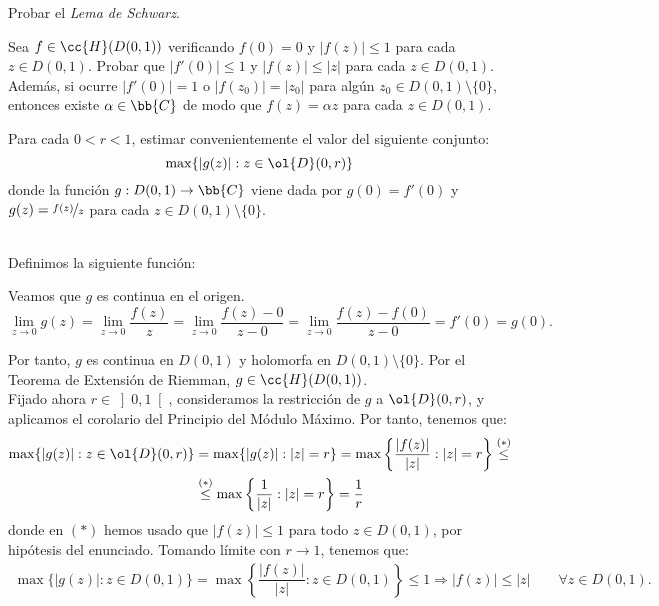\documentclass[12pt]{article}
\begin{document}
    \begin{ejercicio}[2.5 puntos]
        Probar el \emph{Lema de Schwarz}.
        \begin{lema*}[de Schwarz]
            Sea $f \in \cc{H}(D(0, 1))$ verificando $f(0) = 0$ y $|f(z)| \leq 1$ para cada $z \in D(0, 1)$. Probar que $|f'(0)| \leq 1$ y $|f(z)| \leq |z|$ para cada $z \in D(0, 1)$. Además, si ocurre $|f'(0)| = 1$ o $|f(z_0)| = |z_0|$ para algún $z_0 \in D(0, 1) \setminus \{0\}$, entonces existe $\alpha \in \bb{C}$ de modo que $f(z) = \alpha z$ para cada $z \in D(0, 1)$.
        \end{lema*}
        \begin{observacion}
            Para cada $0 < r < 1$, estimar convenientemente el valor del siguiente conjunto: $$\max\{ |g(z)| : z \in \ol{D}(0, r) \}$$ donde la función $g : D(0, 1) \to \bb{C}$ viene dada por $g(0) = f'(0)$ y $g(z) = \nicefrac{f(z)}{z}$ para cada $z \in D(0, 1)\setminus \{0\}$.
        \end{observacion}~\\

        Definimos la siguiente función:

        Veamos que $g$ es continua en el origen.
        \begin{equation*}
            \lim_{z\to 0} g(z) = \lim_{z\to 0} \frac{f(z)}{z} = \lim_{z\to 0} \frac{f(z) - 0}{z - 0} = \lim_{z\to 0} \dfrac{f(z)-f(0)}{z-0} = f'(0) = g(0).
        \end{equation*}

        Por tanto, $g$ es continua en $D(0, 1)$ y holomorfa en $D(0, 1) \setminus \{0\}$. Por el Teorema de Extensión de Riemman, $g\in \cc{H}(D(0, 1))$.\\

        Fijado ahora $r\in \left]0,1\right[$, consideramos la restricción de $g$ a $\ol{D}(0, r)$, y aplicamos el corolario del Principio del Módulo Máximo. Por tanto, tenemos que:
        \begin{align*}
            \max\{ |g(z)| : z \in \ol{D}(0, r) \} &= \max\{ |g(z)| : |z| = r \}
            = \max\left\{\dfrac{|f(z)|}{|z|} : |z| = r\right\}
            \stackrel{(\ast)}{\leq}\\&\stackrel{(\ast)}{\leq} \max\left\{\dfrac{1}{|z|} : |z| = r\right\} = \frac{1}{r}
        \end{align*}
        donde en $(\ast)$ hemos usado que $|f(z)| \leq 1$ para todo $z\in D(0, 1)$, por hipótesis del enunciado. Tomando límite con $r\to 1$, tenemos que:
        \begin{align*}
            \max\{ |g(z)| : z \in D(0, 1) \}
            = \max\left\{ \dfrac{|f(z)|}{|z|} : z \in D(0, 1) \right\}
            \leq 1
            \Longrightarrow
            |f(z)| \leq |z| \qquad \forall z\in D(0, 1).
        \end{align*}


\end{ejercicio}
\end{document}
